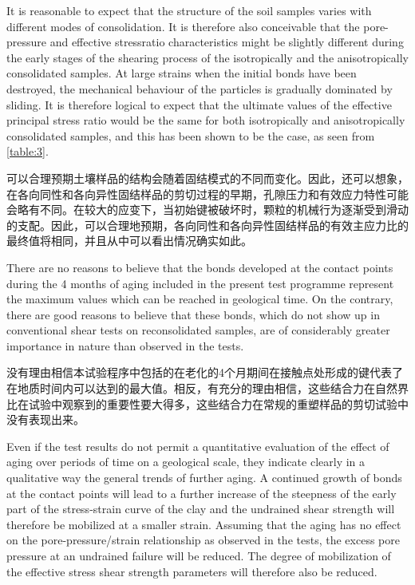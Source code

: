 \begin{paracol}{2}
    \switchcolumn*

    It is reasonable to expect that the structure of the soil samples varies with different modes of consolidation. It is therefore also conceivable that the pore-pressure and effective stressratio characteristics might be slightly different during the early stages of the shearing process of the isotropically and the anisotropically consolidated samples. At large strains when the initial bonds have been destroyed, the mechanical behaviour of the particles is gradually dominated by sliding. It is therefore logical to expect that the ultimate values of the effective principal stress ratio would be the same for both isotropically and anisotropically consolidated samples, and this has been shown to be the case, as seen from \autoref{table:3}.

    \switchcolumn
    
    可以合理预期土壤样品的结构会随着固结模式的不同而变化。因此，还可以想象，在各向同性和各向异性固结样品的剪切过程的早期，孔隙压力和有效应力特性可能会略有不同。在较大的应变下，当初始键被破坏时，颗粒的机械行为逐渐受到滑动的支配。因此，可以合理地预期，各向同性和各向异性固结样品的有效主应力比的最终值将相同，并且从中可以看出情况确实如此。

    \switchcolumn*
    
    There are no reasons to believe that the bonds developed at the contact points during the 4 months of aging included in the present test programme represent the maximum values which can be reached in geological time. On the contrary, there are good reasons to believe that these bonds, which do not show up in conventional shear tests on reconsolidated samples, are of considerably greater importance in nature than observed in the tests.

    \switchcolumn
   
    没有理由相信本试验程序中包括的在老化的4个月期间在接触点处形成的键代表了在地质时间内可以达到的最大值。相反，有充分的理由相信，这些结合力在自然界比在试验中观察到的重要性要大得多，这些结合力在常规的重塑样品的剪切试验中没有表现出来。

    \switchcolumn*
    
    Even if the test results do not permit a quantitative evaluation of the effect of aging over periods of time on a geological scale, they indicate clearly in a qualitative way the general trends of further aging. A continued growth of bonds at the contact points will lead to a further increase of the steepness of the early part of the stress-strain curve of the clay and the undrained shear strength will therefore be mobilized at a smaller strain. Assuming that the aging has no effect on the pore-pressure/strain relationship as observed in the tests, the excess pore pressure at an undrained failure will be reduced. The degree of mobilization of the effective stress shear strength parameters will therefore also be reduced.


\end{paracol}

